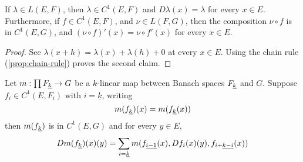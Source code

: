 \documentclass[../main-manifolds.tex]{subfiles}
\begin{document}
\begin{wts}\label{prop:differentiating-linear-maps}
    If $\lambda\in L(E,F)$, then $\lambda\in C^1(E,F)$ and $D\lambda(x) = \lambda$ for every $x\in E$. Furthermore, if $f\in C^1(E,F)$, and $\nu\in L(F,G)$, then the composition $\nu\circ f$ is in $C^1(E,G)$, and $(\nu\circ f)'(x) = \nu\circ f'(x)$ for every $x\in E$.
\end{wts}
\begin{proof}
    See $\lambda(x+h) = \lambda(x) + \lambda(h) + 0$ at every $x\in E$. Using the chain rule (\cref{prop:chain-rule}) proves the second claim.
\end{proof}
\begin{wts}\label{prop:product-rule-k-variables}
    Let $m: \prod \UL{F}[k]\to G$ be a $k$-linear map between Banach spaces $\UL{F}[k]$ and $G$. Suppose $f_i\in C^1(E, F_i)$ with $i=\underline{k}$, writing 
    \begin{equation}\label{eq:k-linear-multiplication-map-def}
        m(\UL{f}[k])(x) = m(\UL{f}[k](x))
    \end{equation}
    then $m(\UL{f}[k])$ is in $C^1(E,G)$ and for every $y\in E$,
    \begin{equation}\label{eq:k-linear-product-rule}
        Dm(\UL{f}[k])(x)(y) = \sum_{i=\underline{k}}m(\UL{f}[i-1](x),Df_i(x)(y),\UL{f}[i+][k-i](x))
    \end{equation}
\end{wts}
\end{document}
